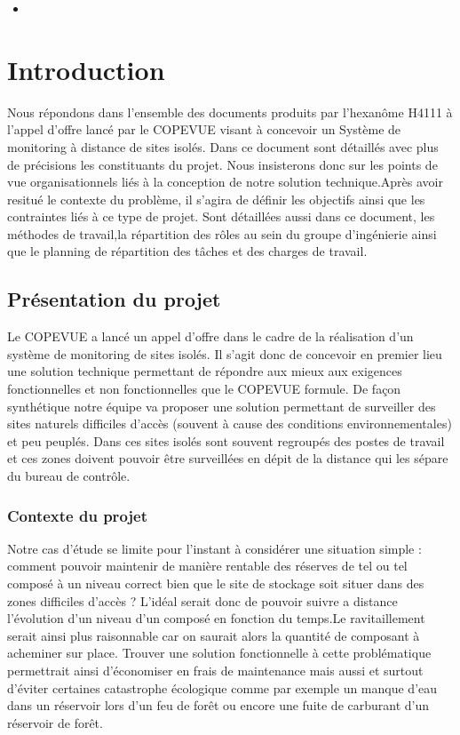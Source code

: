 \begin{itemize}
\item
\end{itemize}


\section{Introduction}
Nous répondons dans l'ensemble des documents produits par l'hexanôme H4111 à l'appel d'offre lancé par le COPEVUE visant à concevoir un Système de monitoring à distance de sites isolés. Dans ce document sont détaillés avec plus de précisions les constituants  du projet. Nous insisterons donc sur les points de vue organisationnels liés à la conception de notre solution technique.Après avoir resitué le contexte du problème, il s'agira de définir les objectifs ainsi que les contraintes liés à ce type de projet. Sont détaillées aussi dans ce document, les méthodes de travail,la répartition des rôles au sein du groupe d'ingénierie ainsi que le planning de répartition des tâches et des charges de travail. 

\subsection{Présentation du projet}
Le COPEVUE a lancé un appel d'offre dans le cadre de la réalisation d'un système de monitoring de sites isolés. Il s'agit donc de concevoir en premier lieu une solution technique permettant de répondre aux mieux aux exigences fonctionnelles et non fonctionnelles que le COPEVUE formule. De façon synthétique notre équipe va proposer une solution permettant de surveiller des sites naturels difficiles d'accès (souvent à cause des conditions environnementales) et peu peuplés. Dans ces sites isolés sont souvent regroupés des postes de travail et ces zones doivent pouvoir être surveillées en dépit de la distance qui les sépare du bureau de contrôle.

\subsubsection{Contexte du projet}
Notre cas d'étude se limite pour l'instant à considérer une situation simple : comment pouvoir maintenir de manière rentable des réserves de tel ou tel composé à un niveau correct bien que le site de stockage soit situer dans des zones difficiles d'accès ? L'idéal serait donc de pouvoir suivre a distance l'évolution d'un niveau d'un composé en fonction du temps.Le ravitaillement serait ainsi plus raisonnable car on saurait alors la quantité de composant à acheminer sur place. Trouver une solution fonctionnelle à cette problématique permettrait ainsi d'économiser en frais de maintenance mais aussi et surtout d'éviter certaines catastrophe écologique comme par exemple un manque d'eau dans un réservoir lors d'un feu de forêt ou encore une fuite de carburant d'un réservoir de forêt.

